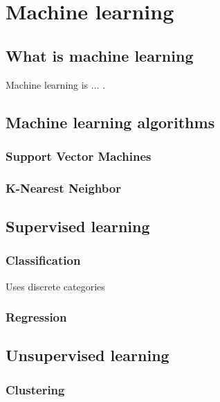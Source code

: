 
\chapter{Machine learning} %

\label{Chapter2} %

\section{What is machine learning}
Machine learning is ... .

\section{Machine learning algorithms}

\subsection{Support Vector Machines}

\subsection{K-Nearest Neighbor}

\section{Supervised learning}
\subsection{Classification}
Uses discrete categories
\subsection{Regression}

\section{Unsupervised learning}
\subsection{Clustering}